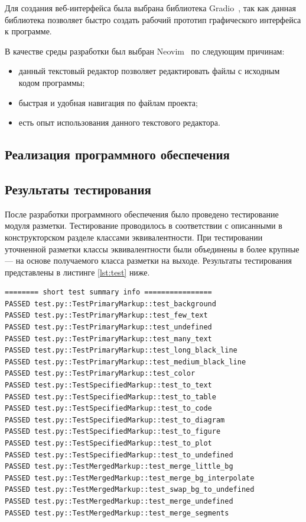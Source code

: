 Для создания веб-интерфейса была выбрана библиотека Gradio~\cite{gradio}, так как данная библиотека позволяет быстро создать рабочий прототип графического интерфейса к программе.

В качестве среды разработки был выбран Neovim~\cite{nvim} по следующим причинам:
\begin{itemize}
    \item данный текстовый редактор позволяет редактировать файлы с исходным кодом программы;
    \item быстрая и удобная навигация по файлам проекта;
    \item есть опыт использования данного текстового редактора.
\end{itemize}


\subsection{Реализация программного обеспечения}


\subsection{Результаты тестирования}

После разработки программного обеспечения было проведено тестирование модуля разметки.
Тестирование проводилось в соответствии с описанными в конструкторском разделе классами эквивалентности.
При тестировании уточненной разметки классы эквивалентности были объединены в более крупные --- на основе получаемого класса разметки на выходе.
Результаты тестирования представлены в листинге \ref{lst:test} ниже.

\begin{lstlisting}[caption={Результаты тестирования}, label={lst:test}]
======== short test summary info ================
PASSED test.py::TestPrimaryMarkup::test_background
PASSED test.py::TestPrimaryMarkup::test_few_text
PASSED test.py::TestPrimaryMarkup::test_undefined
PASSED test.py::TestPrimaryMarkup::test_many_text
PASSED test.py::TestPrimaryMarkup::test_long_black_line
PASSED test.py::TestPrimaryMarkup::test_medium_black_line
PASSED test.py::TestPrimaryMarkup::test_color
PASSED test.py::TestSpecifiedMarkup::test_to_text
PASSED test.py::TestSpecifiedMarkup::test_to_table
PASSED test.py::TestSpecifiedMarkup::test_to_code
PASSED test.py::TestSpecifiedMarkup::test_to_diagram
PASSED test.py::TestSpecifiedMarkup::test_to_figure
PASSED test.py::TestSpecifiedMarkup::test_to_plot
PASSED test.py::TestSpecifiedMarkup::test_to_undefined
PASSED test.py::TestMergedMarkup::test_merge_little_bg
PASSED test.py::TestMergedMarkup::test_merge_bg_interpolate
PASSED test.py::TestMergedMarkup::test_swap_bg_to_undefined
PASSED test.py::TestMergedMarkup::test_merge_undefined
PASSED test.py::TestMergedMarkup::test_merge_segments
\end{lstlisting}

